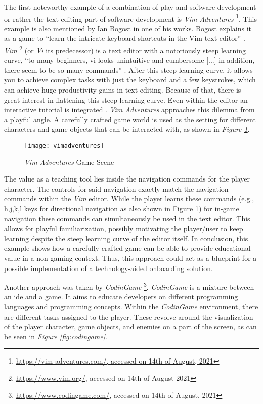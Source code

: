 The first noteworthy example of a combination of play and software development or rather the text editing part of software development is \textit{Vim Adventures} \footnote{\url{https://vim-adventures.com/, accessed on 14th of August, 2021}}. This example is also mentioned by Ian Bogost in one of his works. Bogost explains it as a game to \enquote{learn the intricate keyboard shortcuts in the Vim text editor} \cite[p. 68]{bogost2011things}. \textit{Vim} \footnote{\url{https://www.vim.org/}, accessed on 14th of August 2021} (or \textit{Vi} its predecessor) is a text editor with a notoriously steep learning curve, \enquote{to many beginners, vi looks unintuitive and cumbersome [...] in addition, there seem to be so many commands} \cite[p. 3]{robbins2008learning}. After this steep learning curve, it allows you to achieve complex tasks with just the keyboard and a few keystrokes, which can achieve huge productivity gains in text editing. Because of that, there is great interest in flattening this steep learning curve. Even within the editor an interactive tutorial is integrated \cite{vimtutor}. \textit{Vim Adventures} approaches this dilemma from a playful angle. A carefully crafted game world is used as the setting for different characters and game objects that can be interacted with, as shown in \textit{Figure \ref{fig:vim-adventures}}.

\begin{figure}[h]
  \centering
  \texttt{[image: vimadventures]}
  \caption{\textit{Vim Adventures} Game Scene}
  \label{fig:vim-adventures}
\end{figure}

The value as a teaching tool lies inside the navigation commands for the player character. The controls for said navigation exactly match the navigation commands within the \textit{Vim} editor. While the player learns these commands (e.g., h,j,k,l keys for directional navigation as also shown in Figure \ref{fig:vim-adventures}) for in-game navigation these commands can simultaneously be used in the text editor. This allows for playful familiarization, possibly motivating the player/user to keep learning despite the steep learning curve of the editor itself. In conclusion, this example shows how a carefully crafted game can be able to provide educational value in a non-gaming context. Thus, this approach could act as a blueprint for a possible implementation of a technology-aided onboarding solution.

Another approach was taken by \textit{CodinGame} \footnote{\url{https://www.codingame.com/}, accessed on 14th of August, 2021}. \textit{CodinGame} is a mixture between an \gls{ide} and a game. It aims to educate developers on different programming languages and programming concepts. Within the \textit{CodinGame} environment, there are different tasks assigned to the player. These revolve around the visualization of the player character, game objects, and enemies on a part of the screen, as can be seen in \textit{Figure \ref{fig:codingame}}.


